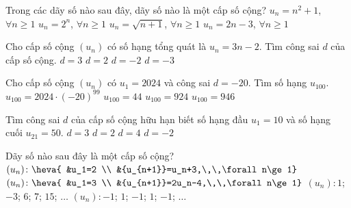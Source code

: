 \begin{ex}%
	Trong các dãy số nào sau đây, dãy số  nào là một cấp số cộng?
	 \choice
		{$u_n=n^2+1$, $\forall n \ge  1$}
		{$u_n=2^n$, $\forall n \ge 1$} 
		{$u_n=\sqrt{n+1}$, $\forall n  \ge 1$}
		{\True $u_n=2n-3$, $\forall n \ge  1$}
\end{ex}

\begin{ex}%
	Cho cấp số cộng $(u_n)$ có số hạng tổng quát là $u_n=3n-2$. Tìm công sai $d$  của cấp số cộng.
	 \choice
		{\True$d=3$} 
		 {$d=2$}
		{$d=-2$} 
		{$d=-3$} 
\end{ex}

\begin{ex}%
	Cho cấp số  cộng $\left(u_n\right)$ có $u_1=2024$ và công sai $ d=-20$. Tìm số hạng $u_{100}$.
	\choice 
		{$u_{100}=2024\cdot  \left(-20\right)^{99}$}
		{\True $u_{100}=44$} 
		 {$u_{100}=924$}
		{$u_{100}=946$} 
\end{ex}

\begin{ex}%
	Tìm công  sai $d$ của cấp số cộng hữu hạn biết số hạng đầu $u_1=10$ và số hạng cuối $u_{21}=50$.
	\choice 
		{$d=3$} 
		{\True  $d=2$}
		 {$d=4$}
		 {$d=-2$}
\end{ex}

\begin{ex}%
	Dãy số  nào sau đây là một cấp số cộng?
	\choice 
		{\True $(u_n)\colon \heva{ 
		 &u_1=2 \\
		&{u_{n+1}}=u_n+3,\,\,\forall  n\ge 1}$}
		{$(u_n)\colon  \heva{
		 &u_1=3 \\
		&{u_{n+1}}=2u_n-4,\,\,\forall n\ge 1}$} 
		{$(u_n)\colon  1$; $-3$; $6$; $7$; $15$; $\ldots$}
		{$(u_n)\colon -1$;  $1$; $-1$; $1$; $-1$; $\ldots$}
\end{ex}

